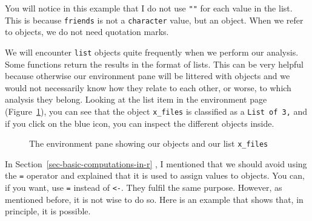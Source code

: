 \documentclass[
  letterpaper,
]{krantz}
\begin{document}
You will notice in this example that I do not use \texttt{""} for each
value in the list. This is because \texttt{friends} is not a
\texttt{character} value, but an object. When we refer to objects, we do
not need quotation marks.

We will encounter \texttt{list} objects quite frequently when we perform
our analysis. Some functions return the results in the format of lists.
This can be very helpful because otherwise our environment pane will be
littered with objects and we would not necessarily know how they relate
to each other, or worse, to which analysis they belong. Looking at the
list item in the environment page (Figure~\ref{fig-img-x-files}), you
can see that the object \texttt{x\_files} is classified as a
\texttt{List\ of\ 3,} and if you click on the blue icon, you can inspect
the different objects inside.

\begin{figure}


\caption{\label{fig-img-x-files}The environment pane showing our objects
and our list \texttt{x\_files}}

\end{figure}%

In Section~\ref{sec-basic-computations-in-r} , I mentioned that we
should avoid using the \texttt{=} operator and explained that it is used
to assign values to objects. You can, if you want, use \texttt{=}
instead of \texttt{\textless{}-}. They fulfil the same purpose. However,
as mentioned before, it is not wise to do so. Here is an example that
shows that, in principle, it is possible.
\end{document}
